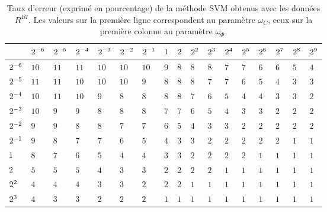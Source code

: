 \begin{table}[htb]
\caption{Taux d'erreur (exprimé en pourcentage) de la méthode SVM obtenus avec les données $R^{BI}$. Les valeurs sur la première ligne correspondent au paramètre $\omega_{C}$, ceux sur la première colonne au paramètre $\omega_{\Phi}$.}
\centering
\begin{tabular}{| p{0.5cm} | p{0.5cm} |p{0.5cm} |p{0.5cm} |p{0.5cm} |p{0.5cm} |p{0.5cm} |p{0.5cm} |p{0.5cm} |p{0.5cm} |p{0.5cm} |p{0.5cm} |p{0.5cm} |p{0.5cm} |p{0.5cm} |p{0.5cm} |p{0.5cm} |}
\hline
& $\cellcolor{gris}{2^{-6}}$&$\cellcolor{gris}{2^{-5}}$&$\cellcolor{gris}{2^{-4}}$&$\cellcolor{gris}{2^{-3}}$&$\cellcolor{gris}{2^{-2}}$&$\cellcolor{gris}{2^{-1}}$&$\cellcolor{gris}{1}$&$\cellcolor{gris}{2}$&$\cellcolor{gris}{2^{2}}$&$\cellcolor{gris}{2^{3}}$&$\cellcolor{gris}{2^{4}}$&$\cellcolor{gris}{2^{5}}$&$\cellcolor{gris}{2^{6}}$&$\cellcolor{gris}{2^{7}}$&$\cellcolor{gris}{2^{8}}$&$\cellcolor{gris}{2^{9}}$\\
\hline
$\cellcolor{gris}{2^{-6}}$ & $10$ & $11$ & $11$ & $10$ & $10$ & $10$ & $9$ & $8$ & $8$ & $8$ & $7$ & $7$ & $6$ & $6$ & $5$ & $4$ \\
\hline
$\cellcolor{gris}{2^{-5}}$ & $11$ & $11$ & $10$ & $10$ & $10$ & $9$ & $8$ & $8$ & $8$ & $7$ & $7$ & $6$ & $5$ & $4$ & $3$ & $3$ \\
\hline
$\cellcolor{gris}{2^{-4}}$ & $10$ & $11$ & $10$ & $9$ & $8$ & $8$ & $8$ & $8$ & $7$ & $6$ & $5$ & $4$ & $4$ & $3$ & $3$ & $2$ \\
\hline
$\cellcolor{gris}{2^{-3}}$ & $10$ & $9$ & $9$ & $8$ & $8$ & $8$ & $7$ & $7$ & $6$ & $5$ & $4$ & $3$ & $3$ & $2$ & $2$ & $2$ \\
\hline
$\cellcolor{gris}{2^{-2}}$ & $9$ & $9$ & $8$ & $8$ & $7$ & $7$ & $6$ & $5$ & $4$ & $3$ & $3$ & $2$ & $2$ & $2$ & $2$ & $2$ \\
\hline
$\cellcolor{gris}{2^{-1}}$ & $9$ & $8$ & $7$ & $7$ & $6$ & $5$ & $4$ & $3$ & $3$ & $2$ & $2$ & $2$ & $2$ & $2$ & $1$ & $1$ \\
\hline
$\cellcolor{gris}{1}$ & $8$ & $7$ & $6$ & $5$ & $4$ & $4$ & $3$ & $3$ & $2$ & $2$ & $2$ & $2$ & $1$ & $1$ & $1$ & $1$ \\
\hline
$\cellcolor{gris}{2}$ & $5$ & $5$ & $5$ & $4$ & $3$ & $3$ & $2$ & $2$ & $2$ & $2$ & $1$ & $1$ & $1$ & $1$ & $1$ & $1$ \\
\hline
$\cellcolor{gris}{2^2}$ & $4$ & $4$ & $4$ & $3$ & $3$ & $2$ & $2$ & $2$ & $1$ & $1$ & $1$ & $1$ & $1$ & $1$ & $1$ & $1$ \\
\hline
$\cellcolor{gris}{2^3}$ & $4$ & $3$ & $3$ & $2$ & $2$ & $2$ & $1$ & $1$ & $1$ & $1$ & $1$ & $1$ & $1$ & $1$ & $1$ & $1$ \\

\end{tabular}
\end{table}
